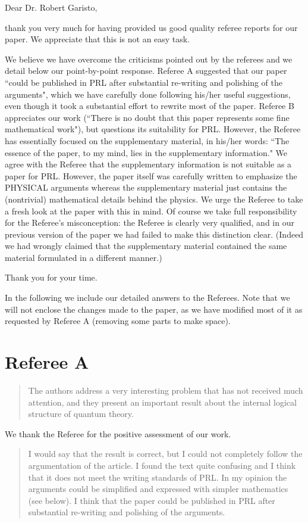 \documentclass[11pt]{article}
\begin{document}
Dear Dr. Robert Garisto, 

thank you very much for having provided us
good quality referee reports for our paper. We appreciate that this is
not an easy task.

We believe we have overcome the criticisms pointed out by the referees
and we detail below our point-by-point response. Referee A suggested
that our paper ``could be published in PRL after substantial re-writing
and polishing of the arguments", which we have carefully done
following his/her useful suggestions, even though it took a
substantial effort to rewrite most of the paper. Referee B appreciates
our work (``There is no doubt that this paper represents some fine
mathematical work"), but questions its suitability for PRL. However,
the Referee has essentially focused on the supplementary material, in
his/her words: ``The essence of the paper, to my mind, lies in the
supplementary information." We agree with the Referee that the
supplementary information is not suitable as a paper for PRL. However,
the paper itself was carefully written to emphasize the PHYSICAL
arguments whereas the supplementary material just contains the
(nontrivial) mathematical details behind the physics. We urge the
Referee to take a fresh look at the paper with this in mind. Of course
we take full responsibility for the Referee's misconception: the
Referee is clearly very qualified, and in our previous version of the
paper we had failed to make this distinction clear. (Indeed we had
wrongly claimed that the supplementary material contained the same
material formulated in a different manner.)

Thank you for your time. 

In the following we include our detailed answers to the Referees. Note 
that we will not enclose the changes made to
the paper, as we have modified most of it as requested by Referee A (removing some parts to make
space).


\section*{Referee A}

\begin{quote}
The authors address a very interesting problem that has
not received much attention, and they present an important result
about the internal logical structure of quantum theory.
\end{quote}

We thank the Referee for the positive assessment of our work.
\begin{quote}
I would say that the result is correct, but I could not
completely follow the argumentation of the article. I found the text
quite confusing and I think that it does not meet the writing
standards of PRL. In my opinion the arguments could be simplified and
expressed with simpler mathematics (see below). I think that the paper
could be published in PRL after substantial re-writing and polishing
of the arguments.
\end{quote}
\end{document}
